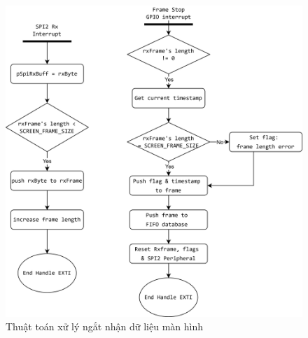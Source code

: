 \begin{figure}[!ht]
    \centering
    \includegraphics[width=1.0\linewidth]{Figures/flowcharts-Device_Receive-screen-frame.png}
    \caption{Thuật toán xử lý ngắt nhận dữ liệu màn hình}
    \label{fig:flowcharts-Device_Receive-screen-frame}
\end{figure}



